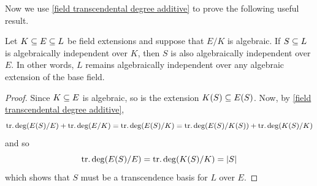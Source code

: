 Now we use \cref{field transcendental degree additive} to prove the following useful result.
\begin{proposition}\label{field transcendence remained under algebraic extension}
Let $K\subseteq E\subseteq L$ be field extensions and suppose that $E/K$ is algebraic. If $S\subseteq L$ is algebraically independent over $K$, then $S$ is also algebraically independent over $E$. In other words, $L$ remains algebraically independent over any algebraic extension of the base field.
\end{proposition}
\begin{proof}
Since $K\subseteq E$ is algebraic, so is the extension $K(S)\subseteq E(S)$. Now, by \cref{field transcendental degree additive},
\[\mathrm{tr}.\deg(E(S)/E)+\mathrm{tr}.\deg(E/K)=\mathrm{tr}.\deg(E(S)/K)=\mathrm{tr}.\deg(E(S)/K(S))+\mathrm{tr}.\deg(K(S)/K)\]
and so
\[\mathrm{tr}.\deg(E(S)/E)=\mathrm{tr}.\deg(K(S)/K)=|S|\]
which shows that $S$ must be a transcendence basis for $L$ over $E$.
\end{proof}
